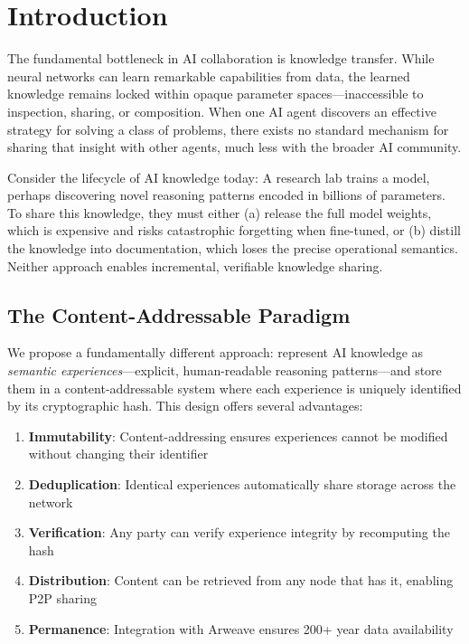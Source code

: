 \section{Introduction}


The fundamental bottleneck in AI collaboration is knowledge transfer. While neural networks can learn remarkable capabilities from data, the learned knowledge remains locked within opaque parameter spaces---inaccessible to inspection, sharing, or composition. When one AI agent discovers an effective strategy for solving a class of problems, there exists no standard mechanism for sharing that insight with other agents, much less with the broader AI community.

Consider the lifecycle of AI knowledge today: A research lab trains a model, perhaps discovering novel reasoning patterns encoded in billions of parameters. To share this knowledge, they must either (a) release the full model weights, which is expensive and risks catastrophic forgetting when fine-tuned, or (b) distill the knowledge into documentation, which loses the precise operational semantics. Neither approach enables incremental, verifiable knowledge sharing.

\subsection{The Content-Addressable Paradigm}

We propose a fundamentally different approach: represent AI knowledge as \emph{semantic experiences}---explicit, human-readable reasoning patterns---and store them in a content-addressable system where each experience is uniquely identified by its cryptographic hash. This design offers several advantages:

\begin{enumerate}
    \item \textbf{Immutability}: Content-addressing ensures experiences cannot be modified without changing their identifier
    \item \textbf{Deduplication}: Identical experiences automatically share storage across the network
    \item \textbf{Verification}: Any party can verify experience integrity by recomputing the hash
    \item \textbf{Distribution}: Content can be retrieved from any node that has it, enabling P2P sharing
    \item \textbf{Permanence}: Integration with Arweave ensures 200+ year data availability
\end{enumerate}

